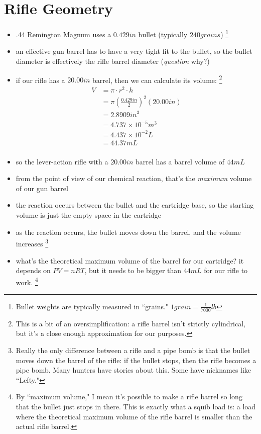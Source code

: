 \documentclass[11pt, oneside]{article}   	%
\begin{document}
\section{Rifle Geometry}
\begin{itemize}
\item .44 Remington Magnum uses a $0.429 in$ bullet (typically $240 grains$)
\footnote{Bullet weights are typically measured in ``grains." $1 grain = \frac{1}{7 000} lb$}
\item an effective gun barrel has to have a very tight fit to the bullet, so the bullet diameter is effectively the rifle barrel diameter (\emph{question} why?)
\item if our rifle has a $20.00 in$ barrel, then we can calculate its volume:
\footnote{This is a bit of an oversimplification: a rifle barrel isn't strictly cylindrical, but it's a close enough approximation for our purposes.}\\
\begin{equation} 
\begin{split}
 V &= \pi \cdot r^{2} \cdot h \\
    &= \pi (\frac{0.429 in}{2})^{2} (20.00 in) \\
    &= 2.8909 in^{3} \\
    &= 4.737 \times 10^{-5} m^{3} \\
    &= 4.437 \times 10^{-2} L \\
    &= 44.37 mL\\
\end{split}
 \end{equation}
\item so the lever-action rifle with a $20.00 in$ barrel has a barrel volume of $44 mL$
\item from the point of view of our chemical reaction, that's the \emph{maximum} volume of our gun barrel
\item the reaction occurs between the bullet and the cartridge base, so the starting volume is just the empty space in the cartridge
\item as the reaction occurs, the bullet moves down the barrel, and the volume increases
\footnote{Really the only difference between a rifle and a pipe bomb is that the bullet moves down the barrel of the rifle: if the bullet stops, then the rifle becomes a pipe bomb.
Many hunters have stories about this. Some have nicknames like ``Lefty."}
\item what's the theoretical maximum volume of the barrel for our cartridge?  it depends on $P V = n R T$, but it needs to be bigger than $44 mL$ for our rifle to work.
\footnote{By ``maximum volume," I mean it's possible to make a rifle barrel so long that the bullet just stops in there. 
This is exactly what a squib load is: a load where the theoretical maximum volume of the rifle barrel is smaller than the actual rifle barrel.}
\end{itemize}
\end{document}

